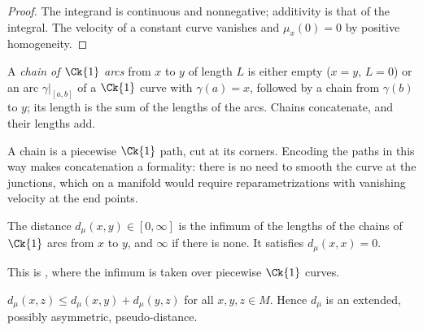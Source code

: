 \begin{proof}
  \leanok
  The integrand is continuous and nonnegative; additivity is that of the integral. The velocity
  of a constant curve vanishes and $\mu_x(0) = 0$ by positive homogeneity.
\end{proof}

\begin{definition}
  \label{def:mt-chain}
  \leanok
  A \emph{chain of $\Ck{1}$ arcs} from $x$ to $y$ of length $L$ is either empty ($x = y$, $L = 0$)
  or an arc $\gamma|_{[a, b]}$ of a $\Ck{1}$ curve with $\gamma(a) = x$, followed by a chain from
  $\gamma(b)$ to $y$; its length is the sum of the lengths of the arcs. Chains concatenate, and
  their lengths add.
\end{definition}

A chain is a piecewise $\Ck{1}$ path, cut at its corners. Encoding the paths in this way makes
concatenation a formality: there is no need to smooth the curve at the junctions, which on a
manifold would require reparametrizations with vanishing velocity at the end points.

\begin{definition}
  \label{def:mt-dist}
  \leanok
  The distance $d_\mu(x, y) \in [0, \infty]$ is the infimum of the lengths of the chains of
  $\Ck{1}$ arcs from $x$ to $y$, and $\infty$ if there is none. It satisfies $d_\mu(x, x) = 0$.
\end{definition}

This is \cite[Def.~2.7]{Lar19}, where the infimum is taken over piecewise $\Ck{1}$ curves.

\begin{theorem}
  \label{thm:mt-triangle}
  \leanok
  $d_\mu(x, z) \leq d_\mu(x, y) + d_\mu(y, z)$ for all $x, y, z \in M$. Hence $d_\mu$ is an
  extended, possibly asymmetric, pseudo-distance.
\end{theorem}

